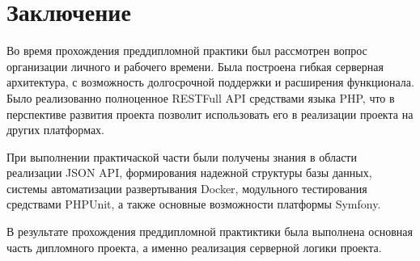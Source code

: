 









\section{Заключение}

Во время прохождения преддипломной практики был рассмотрен вопрос организации личного и рабочего времени. Была построена гибкая серверная архитектура, с возможность долгосрочной поддержки и расширения функционала. Было реализованно полноценное RESTFull API средствами языка PHP, что в перспективе развития проекта позволит использовать его в реализации проекта на других платформах.

При выполнении практичаской части были получены знания в области реализации JSON API, формирования надежной структуры базы данных, системы автоматизации развертывания Docker, модульного тестирования средствами PHPUnit, а также основные возможности платформы Symfony. 

В результате прохождения преддипломной практиктики была выполнена основная часть дипломного проекта, а именно реализация серверной логики проекта.
